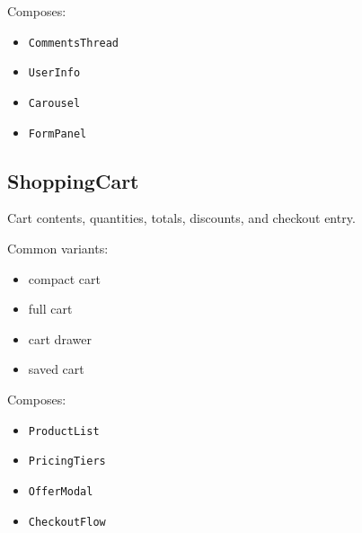 Composes:

\begin{itemize}
\tightlist
\item
  \texttt{C\allowbreak{}o\allowbreak{}m\allowbreak{}m\allowbreak{}e\allowbreak{}n\allowbreak{}t\allowbreak{}s\allowbreak{}T\allowbreak{}h\allowbreak{}r\allowbreak{}e\allowbreak{}a\allowbreak{}d}
\item
  \texttt{U\allowbreak{}s\allowbreak{}e\allowbreak{}r\allowbreak{}I\allowbreak{}n\allowbreak{}f\allowbreak{}o}
\item
  \texttt{C\allowbreak{}a\allowbreak{}r\allowbreak{}o\allowbreak{}u\allowbreak{}s\allowbreak{}e\allowbreak{}l}
\item
  \texttt{F\allowbreak{}o\allowbreak{}r\allowbreak{}m\allowbreak{}P\allowbreak{}a\allowbreak{}n\allowbreak{}e\allowbreak{}l}
\end{itemize}

\subsection{ShoppingCart}\label{record-128-shoppingcart}

Cart contents, quantities, totals, discounts, and checkout entry.

Common variants:

\begin{itemize}
\tightlist
\item
  compact cart
\item
  full cart
\item
  cart drawer
\item
  saved cart
\end{itemize}

Composes:

\begin{itemize}
\tightlist
\item
  \texttt{P\allowbreak{}r\allowbreak{}o\allowbreak{}d\allowbreak{}u\allowbreak{}c\allowbreak{}t\allowbreak{}L\allowbreak{}i\allowbreak{}s\allowbreak{}t}
\item
  \texttt{P\allowbreak{}r\allowbreak{}i\allowbreak{}c\allowbreak{}i\allowbreak{}n\allowbreak{}g\allowbreak{}T\allowbreak{}i\allowbreak{}e\allowbreak{}r\allowbreak{}s}
\item
  \texttt{O\allowbreak{}f\allowbreak{}f\allowbreak{}e\allowbreak{}r\allowbreak{}M\allowbreak{}o\allowbreak{}d\allowbreak{}a\allowbreak{}l}
\item
  \texttt{C\allowbreak{}h\allowbreak{}e\allowbreak{}c\allowbreak{}k\allowbreak{}o\allowbreak{}u\allowbreak{}t\allowbreak{}F\allowbreak{}l\allowbreak{}o\allowbreak{}w}
\end{itemize}

